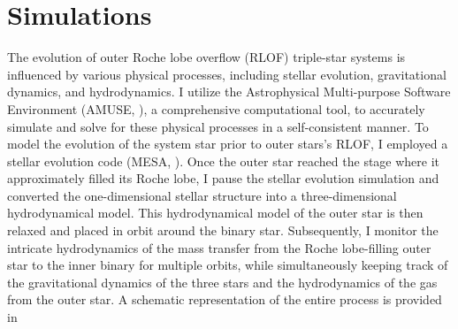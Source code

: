 \chapter{Simulations}


The evolution of outer Roche lobe overflow (RLOF) triple-star systems is influenced by various physical processes, including stellar evolution, gravitational dynamics, and hydrodynamics. I utilize the Astrophysical Multi-purpose Software Environment (AMUSE, \cite{portegies2018astrophysical}), a comprehensive computational tool, to accurately simulate and solve for these physical processes in a self-consistent manner. To model the evolution of the system star prior to outer stars's RLOF, I employed a stellar evolution code (MESA, \cite{paxton2010modules,paxton2013modules,paxton2015modules,paxton2019modules}). Once the outer star reached the stage where it approximately filled its Roche lobe, I pause the stellar evolution simulation and converted the one-dimensional stellar structure into a three-dimensional hydrodynamical model. This hydrodynamical model of the outer star is then relaxed and placed in orbit around the binary star. Subsequently, I monitor the intricate hydrodynamics of the mass transfer from the Roche lobe-filling outer star to the inner binary for multiple orbits, while simultaneously keeping track of the gravitational dynamics of the three stars and the hydrodynamics of the gas from the outer star. A schematic representation of the entire process is provided in 

